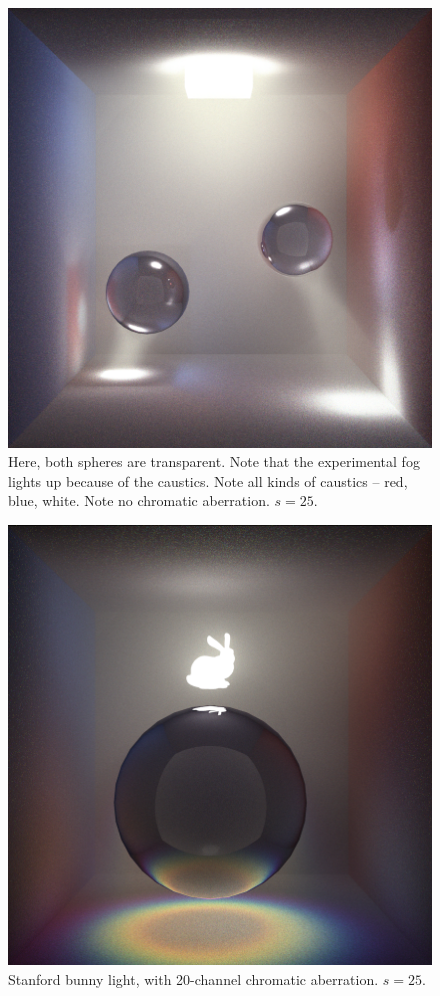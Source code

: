 \documentclass[12pt]{article}
\begin{document}
\begin{figure} 
\centering
  \includegraphics[width = 6 in]{fig9.png}
  \caption{ Here, both spheres are transparent. 
Note that the experimental fog lights up because of the caustics.
Note all kinds of caustics -- red, blue, white.
Note no chromatic aberration.
$s = 25$.
}
\end{figure}


\begin{figure} 
\centering
  \includegraphics[width = 6 in]{fig10.png}
  \caption{ Stanford bunny light, with 20-channel chromatic aberration.
$s = 25$.
}
\end{figure}
\end{document}
